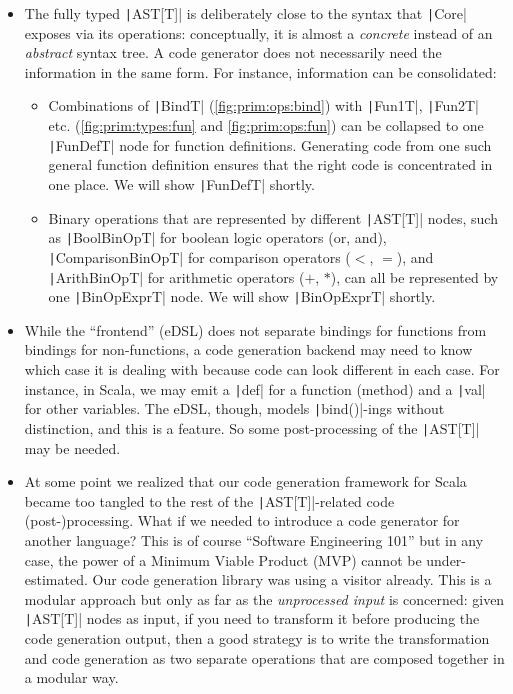 \documentclass[11pt]{article}
\newcommand{\ScalaI}[1]{\texttt|#1|}
\begin{document}
\begin{itemize}
  \item The fully typed \ScalaI{AST[T]} is deliberately close to the syntax that \ScalaI{Core} exposes via its operations: conceptually, it is almost a \textit{concrete} instead of an \textit{abstract} syntax tree. A code generator does not necessarily need the information in the same form. For instance, information can be consolidated:

  \begin{itemize}
      \item Combinations of \ScalaI{BindT} (\autoref{fig:prim:ops:bind}) with \ScalaI{Fun1T}, \ScalaI{Fun2T} etc. (\autoref{fig:prim:types:fun} and \autoref{fig:prim:ops:fun}) can be collapsed to one \ScalaI{FunDefT} node for function definitions. Generating code from one such general function definition ensures that the right code is concentrated in one place. We will show \ScalaI{FunDefT} shortly.
      
      \item Binary operations that are represented by different \ScalaI{AST[T]} nodes, such as \ScalaI{BoolBinOpT} for boolean logic operators (\textsf{or}, \textsf{and}), \ScalaI{ComparisonBinOpT} for comparison operators ($<$, $=$), and \ScalaI{ArithBinOpT} for arithmetic operators ($+$, $*$), can all be represented by one \ScalaI{BinOpExprT} node. We will show \ScalaI{BinOpExprT} shortly.
  \end{itemize}
  
  \item While the ``frontend'' (eDSL) does not separate bindings for functions from bindings for non-functions, a code generation backend may need to know which case it is dealing with because code can look different in each case. For instance, in Scala, we may emit a \ScalaI{def} for a function (method) and a \ScalaI{val} for other variables. The eDSL, though, models \ScalaI{bind()}-ings without distinction, and this is a feature. So some post-processing of the \ScalaI{AST[T]} may be needed.

  \item At some point we realized that our code generation framework for Scala became too tangled to the rest of the \ScalaI{AST[T]}-related code (post-)processing. What if we needed to introduce a code generator for another language? This is of course ``Software Engineering 101'' but in any case, the power of a Minimum Viable Product (MVP) cannot be under-estimated. Our code generation library was using a visitor already. This is a modular approach but only as far as the \textit{unprocessed input} is concerned: given \ScalaI{AST[T]} nodes as input, if you need to transform it before producing the code generation output, then a good strategy is to write the transformation and code generation as two separate operations that are composed together in a modular way.
  

\end{itemize}
\end{document}
